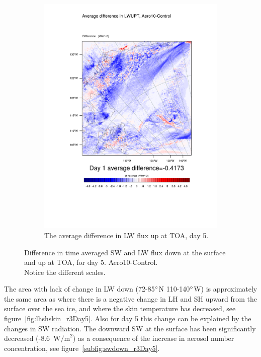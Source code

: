 \begin{figure}
\begin{subfigure}{0.48\textwidth}
		\includegraphics[width=\textwidth]{results/aero10/diff_Aero10_LWUPT_Day5.pdf}
		\caption{The average difference in LW flux up at TOA, day 5.}
		\label{subfig:lwup_r3Day5}
	\end{subfigure}
	\caption{Difference in time averaged SW and LW flux down at the surface and up at TOA, for day 5. Aero10-Control.\\Notice the different scales.}
	\label{fig:radiation_r3Day5}
\end{figure}

The area with lack of change in LW down (72-85$\degree$N 110-140$\degree$W) is approximately the same area as where there is a negative change in LH and SH upward from the surface over the sea ice, and where the skin temperature has decreased, see figure~\ref{fig:lhshskin_r3Day5}. Also for day 5 this change can be explained by the changes in SW radiation. The downward SW at the surface has been significantly decreased (-8.6~$\text{W/m}^2$) as a consequence of the increase in aerosol number concentration, see figure~\ref{subfig:swdown_r3Day5}.

